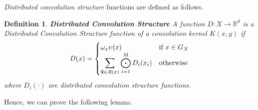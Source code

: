 \documentclass[twoside,11pt]{article}
\newtheorem{definition}{Definition}
\newtheorem{theorem}{Theorem}
\def\vec#1{\mathbf{#1}}
\def\svec#1{\vec{#1}}
\def\substr#1{{\bf\overline{#1}}}
\def\R{\mathbb{R}}
\def\basicdf{\upsilon}
\def\Mo{\bigodot}
\def\comment#1#2{}
\def\finalsecondcomment#1#2{}
\begin{document}
\emph{Distributed convolution structure} functions are defined as follows.
\begin{definition}\textbf{Distributed Convolution Structure}
\label{d_definition}
A function $D: X \rightarrow \R^d$ is a Distributed Convolution Structure function of a convolution kernel $K(x,y)$ if
\begin{displaymath}
D(x) = \begin{cases} 
		\omega_x\basicdf(x) & \mbox{if } x\in G_X\\ 
		\displaystyle\sum_{\substr{x} \in R(x)} \displaystyle\Mo_{i=1}^M D_i(x_i) & \mbox{otherwise} 
		\end{cases}
\end{displaymath}
where $D_i(\cdot)$ are distributed convolution structure functions.
\end{definition}




%
%



\finalsecondcomment{R3.10}{Proof of lemma 9: "The theorem is proved by structural induction". What is structural induction?}

Hence, we can prove the following lemma.
\end{document}
